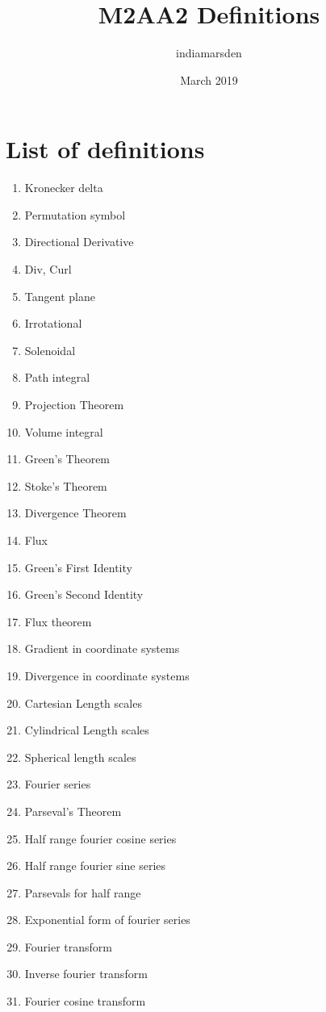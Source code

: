 \documentclass{article}
\title{M2AA2 Definitions}
\author{indiamarsden }
\date{March 2019}
\begin{document}
\maketitle
\section*{List of definitions}
\begin{enumerate}
    \item Kronecker delta
    \item Permutation symbol
    \item Directional Derivative
    \item Div, Curl
    \item Tangent plane
    \item Irrotational
    \item Solenoidal
    \item Path integral
    \item Projection Theorem
    \item Volume integral
    \item Green's Theorem
    \item Stoke's Theorem
    \item Divergence Theorem
    \item Flux
    \item Green's First Identity
    \item Green's Second Identity
    \item Flux theorem
    \item Gradient in coordinate systems
    \item Divergence in coordinate systems
    \item Cartesian Length scales
    \item Cylindrical Length scales
    \item Spherical length scales
    \item Fourier series
    \item Parseval's Theorem
    \item Half range fourier cosine series
    \item Half range fourier sine series
    \item Parsevals for half range
    \item Exponential form of fourier series
    \item Fourier transform
    \item Inverse fourier transform
    \item Fourier cosine transform

\end{enumerate}
\end{document}
